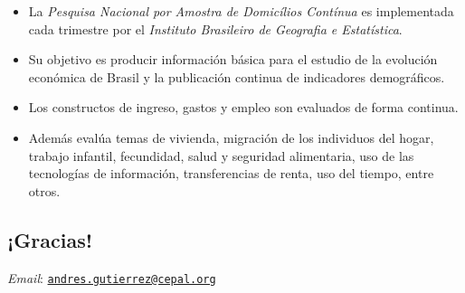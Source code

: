 \documentclass[
]{article}
\providecommand{\tightlist}{%
  \setlength{\itemsep}{0pt}\setlength{\parskip}{0pt}}
\begin{document}
\begin{itemize}
\tightlist
\item
  La \emph{Pesquisa Nacional por Amostra de Domicílios Contínua} es
  implementada cada trimestre por el \emph{Instituto Brasileiro de
  Geografia e Estatística}.
\item
  Su objetivo es producir información básica para el estudio de la
  evolución económica de Brasil y la publicación continua de indicadores
  demográficos.
\item
  Los constructos de ingreso, gastos y empleo son evaluados de forma
  continua.
\item
  Además evalúa temas de vivienda, migración de los individuos del
  hogar, trabajo infantil, fecundidad, salud y seguridad alimentaria,
  uso de las tecnologías de información, transferencias de renta, uso
  del tiempo, entre otros.
\end{itemize}

\hypertarget{gracias}{%
\subsection{¡Gracias!}\label{gracias}}

\emph{Email}:
\href{mailto:andres.gutierrez@cepal.org}{\nolinkurl{andres.gutierrez@cepal.org}}
\end{document}
